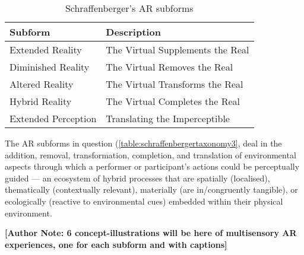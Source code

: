 \begin{table}
    \centering
    \begin{tabular}{ l l }
        \toprule
        Subform             & Description                       \\
        \midrule
        Extended Reality    & The Virtual Supplements the Real  \\
        Diminished Reality  & The Virtual Removes the Real      \\
        Altered Reality     & The Virtual Transforms the Real   \\
        Hybrid Reality      & The Virtual Completes the Real    \\
        Extended Perception & Translating the Imperceptible     \\
        \bottomrule
    \end{tabular}
    \caption{Schraffenberger's AR subforms}\label{table:schraffenbergertaxonomy3}
\end{table}

The AR subforms in question (\autoref{table:schraffenbergertaxonomy3}, deal in the addition, removal, transformation, completion, and translation of environmental aspects through which a performer or participant's actions could be perceptually guided — an ecosystem of hybrid processes that are spatially (localised), thematically (contextually relevant), materially (are in/congruently tangible), or ecologically (reactive to environmental cues) embedded within their physical environment.

\textbf{[Author Note: 6 concept-illustrations will be here of multisensory AR experiences, one for each subform and with captions]}


